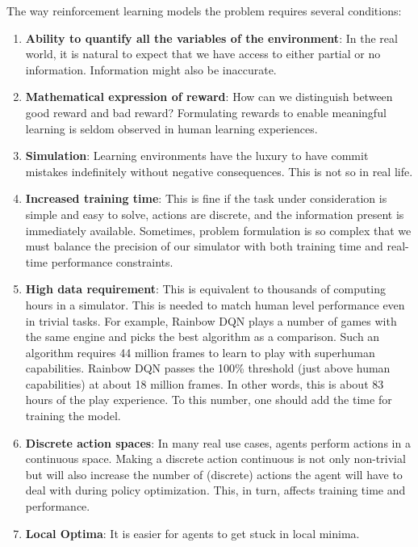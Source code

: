 \documentclass[conference]{IEEEtran}
\begin{document}
The way reinforcement learning models the problem requires several conditions:
\begin{enumerate}
    \item \textbf{Ability to quantify all the variables of the environment}: In the real world, it is natural to expect that we have access to either partial or no information. Information might also be inaccurate.

    \item \textbf{Mathematical expression of reward}: How can we distinguish between good reward and bad reward? Formulating rewards to enable meaningful learning is seldom observed in human learning experiences.

    \item \textbf{Simulation}: Learning environments have the luxury to have commit mistakes indefinitely without negative consequences. This is not so in real life.
    
    \item \textbf{Increased training time}: This is fine if the task under consideration is simple and easy to solve, actions are discrete, and the information present is immediately available. Sometimes, problem formulation is so complex that we must balance the precision of our simulator with both training time and real-time performance constraints.
    
    \item \textbf{High data requirement}: This is equivalent to thousands of computing hours in a simulator. This is needed to match human level performance even in trivial tasks. For example, Rainbow DQN plays a number of games with the same engine and picks the best algorithm as a comparison. Such an algorithm requires 44 million frames to learn to play with superhuman capabilities. Rainbow DQN passes the 100\% threshold (just above human capabilities) at about 18 million frames. In other words, this is about 83 hours of the play experience. To this number, one should add the time for training the model.
    
    \item \textbf{Discrete action spaces}: In many real use cases, agents perform actions in a continuous space. Making a discrete action continuous is not only non-trivial but will also increase the number of (discrete) actions the agent will have to deal with during policy optimization. This, in turn, affects training time and performance.
    
    \item \textbf{Local Optima}: It is easier for agents to get stuck in local minima. 
\end{enumerate}
\end{document}
